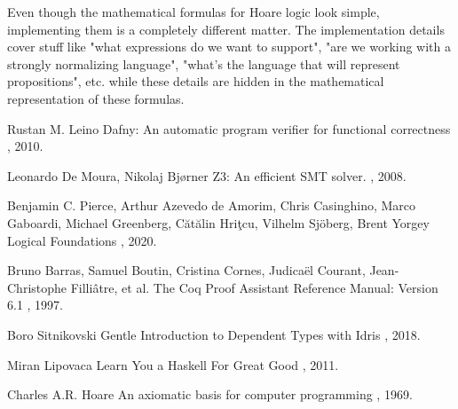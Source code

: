 \documentclass{article}
\theoremstyle{definition}
\begin{document}
Even though the mathematical formulas for Hoare logic look simple, implementing them is a completely different matter. The implementation details cover stuff like "what expressions do we want to support", "are we working with a strongly normalizing language", "what's the language that will represent propositions", etc. while these details are hidden in the mathematical representation of these formulas.

\begin{thebibliography}{1}

Rustan M. Leino
\newblock Dafny: An automatic program verifier for functional correctness
, 2010.

Leonardo De Moura, Nikolaj Bjørner
\newblock Z3: An efficient SMT solver.
, 2008.

Benjamin C. Pierce, Arthur Azevedo de Amorim, Chris Casinghino, Marco Gaboardi, Michael Greenberg, Cătălin Hriţcu, Vilhelm Sjöberg, Brent Yorgey
\newblock Logical Foundations
, 2020.

Bruno Barras, Samuel Boutin, Cristina Cornes, Judicaël Courant, Jean-Christophe Filliâtre, et al.
\newblock The Coq Proof Assistant Reference Manual: Version 6.1
, 1997.

Boro Sitnikovski
\newblock Gentle Introduction to Dependent Types with Idris
, 2018.

Miran Lipovaca
\newblock Learn You a Haskell For Great Good
, 2011.

Charles A.R. Hoare
\newblock An axiomatic basis for computer programming
, 1969.

\end{thebibliography}
\end{document}
